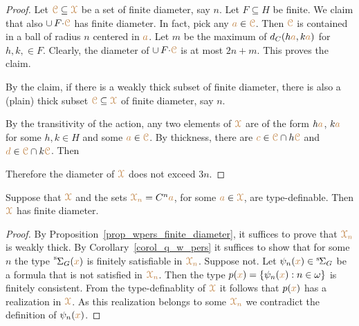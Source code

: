 \begin{proof}
  Let ${\color{brown}\EuScript C}\subseteq{\color{brown}\EuScript X}$ be a set of finite diameter, say $n$.
  Let $F\subseteq H$ be finite.
  We claim that also $\cup\,F{\cdot}{\color{brown}\EuScript C}$ has finite diameter.
  In fact, pick any ${\color{brown} a}\in{\color{brown}\EuScript C}$.
  Then ${\color{brown}\EuScript C}$ is contained in a ball of radius $n$ centered in ${\color{brown} a}$. Let $m$ be the maximum of $d_C(h{\color{brown} a}, k{\color{brown} a})$ for $h,k,\in F$.
  Clearly, the diameter of $\cup\,F{\cdot}{\color{brown}\EuScript C}$ is at most $2n+m$.
  This proves the claim.

  By the claim, if there is a weakly thick subset of finite diameter, there is also a (plain) thick subset ${\color{brown}\EuScript C}\subseteq{\color{brown}\EuScript X}$ of finite diameter, say $n$.
  
  By the transitivity of the action, any two elements of ${\color{brown}\EuScript X}$ are of the form $h{\color{brown} a}$, $k{\color{brown} a}$ for some $h,k\in H$ and some ${\color{brown} a}\in{\color{brown}\EuScript C}$.
  By thickness, there are ${\color{brown} c}\in{\color{brown}\EuScript C}\cap h{\color{brown}\EuScript C}$ and ${\color{brown} d}\in{\color{brown}\EuScript C}\cap k{\color{brown}\EuScript C}$.
  Then 



  Therefore the diameter of ${\color{brown}\EuScript X}$ does not exceed $3n$.
\end{proof}

\begin{theorem}\label{thm_newelski}
  Suppose that ${\color{brown}\EuScript X}$ and the sets ${\color{brown}\EuScript X_n}=C^n{\color{brown} a}$, for some ${\color{brown} a}\in{\color{brown}\EuScript X}$, are type-definable.
  Then ${\color{brown}\EuScript X}$ has finite diameter.
\end{theorem}

\begin{proof}
  By Proposition~\ref{prop_wpers_finite_diameter}, it suffices to prove that ${\color{brown}\EuScript X_n}$ is weakly thick.
  By Corollary~\ref{corol_q_w_pers} it suffices to show that for some $n$ the type ${\mathstrut}^{\rm s}\kern-.1ex\Sigma_G({\color{brown} x})$ is finitely satisfiable in ${\color{brown}\EuScript X_n}$.
  Suppose not.
  Let $\psi_n({\color{brown} x})\in{}^{\rm s}\kern-.2ex\Sigma_G$ be a formula that is not satisfied in $\color{brown}\EuScript X_n$.
  Then the type $p({\color{brown} x})=\{\psi_n({\color{brown} x}):n\in\omega\}$ is finitely consistent.
  From the type-definablity of ${\color{brown}\EuScript X}$ it follows that $p({\color{brown} x})$ has a realization in ${\color{brown}\EuScript X}$.
  As this realization belongs to some ${\color{brown}\EuScript X_n}$ we contradict the definition of $\psi_n({\color{brown} x})$.
\end{proof}


